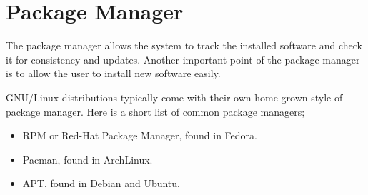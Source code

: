 
\section{Package Manager} %
\label{sec:packages}

The package manager allows the system to track the installed
software and check it for consistency and updates. Another
important point of the package manager is to allow the user
to install new software easily.

\begin{exmp}
	GNU/Linux distributions typically come with their own
	home grown style of package manager. Here is a short
	list of common package managers;
	\begin{itemize}
		\item RPM or Red-Hat Package Manager, found in Fedora.
		\item Pacman, found in ArchLinux.
		\item APT, found in Debian and Ubuntu.
	\end{itemize}
\end{exmp}
